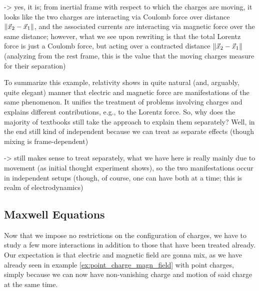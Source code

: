 \documentclass[../class_mech_main.tex]{subfiles}
\begin{document}
\begin{ex}
     -> yes, it is; from inertial frame with respect to which the charges are moving, it looks like the two charges are interacting via Coulomb force over distance $\norm{\vec{x}_2 - \vec{x}_1}$, and the associated currents are interacting via magnetic force over the same distance; however, what we see upon rewriting is that the total Lorentz force is just a Coulomb force, but acting over a contracted distance $\norm{\vec{x}_2 - \vec{x}_1}$ (analyzing from the rest frame, this is the value that the moving charges measure for their separation)

\end{ex}
To summarize this example, relativity shows in quite natural (and, arguably, quite elegant) manner that electric and magnetic force are manifestations of the same phenomenon. It unifies the treatment of problems involving charges and explains different contributions, e.g., to the Lorentz force. So, why does the majority of textbooks still take the approach to explain them separately? Well, in the end still kind of independent because we can treat as separate effects (though mixing is frame-dependent)

-> still makes sense to treat separately, what we have here is really mainly due to movement (as initial thought experiment shows), so the two manifestations occur in independent setups (though, of course, one can have both at a time; this is realm of electrodynamics)










        \subsection{Maxwell Equations}
Now that we impose no restrictions on the configuration of charges, we have to study a few more interactions in addition to those that have been treated already. Our expectation is that electric and magnetic field are gonna mix, as we have already seen in example \ref{ex:point_charge_magn_field} with point charges, simply because we can now have non-vanishing charge and motion of said charge at the same time.
\end{document}
